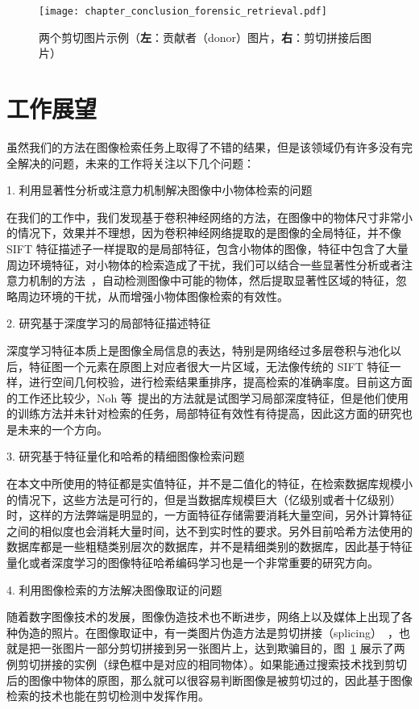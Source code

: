 \begin{figure}
\centering
\texttt{[image: chapter\_conclusion\_forensic\_retrieval.pdf]}
\caption{两个剪切图片示例（\textbf{左}：贡献者（donor）图片，\textbf{右}：剪切拼接后图片）}
\label{fig:forensic_image_retrieval}
\end{figure}

\section{工作展望}
虽然我们的方法在图像检索任务上取得了不错的结果，但是该领域仍有许多没有完全解决的问题，未来的工作将关注以下几个问题：

1. 利用显著性分析或注意力机制解决图像中小物体检索的问题

在我们的工作中，我们发现基于卷积神经网络的方法，在图像中的物体尺寸非常小的情况下，效果并不理想，因为卷积神经网络提取的是图像的全局特征，并不像 SIFT 特征描述子一样提取的是局部特征，包含小物体的图像，特征中包含了大量周边环境特征，对小物体的检索造成了干扰，我们可以结合一些显著性分析或者注意力机制的方法~\cite{Song2017DeepSA}，自动检测图像中可能的物体，然后提取显著性区域的特征，忽略周边环境的干扰，从而增强小物体图像检索的有效性。

2. 研究基于深度学习的局部特征描述特征

深度学习特征本质上是图像全局信息的表达，特别是网络经过多层卷积与池化以后，特征图一个元素在原图上对应者很大一片区域，无法像传统的 SIFT 特征一样，进行空间几何校验，进行检索结果重排序，提高检索的准确率度。目前这方面的工作还比较少，Noh 等~\cite{Noh2017LargeScaleIR}提出的方法就是试图学习局部深度特征，但是他们使用的训练方法并未针对检索的任务，局部特征有效性有待提高，因此这方面的研究也是未来的一个方向。

3. 研究基于特征量化和哈希的精细图像检索问题

在本文中所使用的特征都是实值特征，并不是二值化的特征，在检索数据库规模小的情况下，这些方法是可行的，但是当数据库规模巨大（亿级别或者十亿级别）时，这样的方法弊端是明显的，一方面特征存储需要消耗大量空间，另外计算特征之间的相似度也会消耗大量时间，达不到实时性的要求。另外目前哈希方法使用的数据库都是一些粗糙类别层次的数据库，并不是精细类别的数据库，因此基于特征量化或者深度学习的图像特征哈希编码学习也是一个非常重要的研究方向。

4. 利用图像检索的方法解决图像取证的问题

随着数字图像技术的发展，图像伪造技术也不断进步，网络上以及媒体上出现了各种伪造的照片。在图像取证中，有一类图片伪造方法是剪切拼接（splicing）~\cite{Farid2009ImageFD}，也就是把一张图片一部分剪切拼接到另一张图片上，达到欺骗目的，图~\ref{fig:forensic_image_retrieval} 展示了两例剪切拼接的实例（绿色框中是对应的相同物体）。如果能通过搜索技术找到剪切后的图像中物体的原图，那么就可以很容易判断图像是被剪切过的，因此基于图像检索的技术也能在剪切检测中发挥作用。



